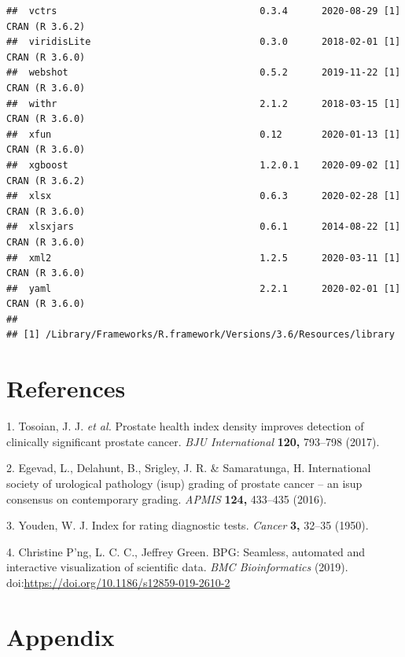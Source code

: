 \documentclass[]{article}
\begin{document}
\begin{verbatim}
##  vctrs                                    0.3.4      2020-08-29 [1] CRAN (R 3.6.2)
##  viridisLite                              0.3.0      2018-02-01 [1] CRAN (R 3.6.0)
##  webshot                                  0.5.2      2019-11-22 [1] CRAN (R 3.6.0)
##  withr                                    2.1.2      2018-03-15 [1] CRAN (R 3.6.0)
##  xfun                                     0.12       2020-01-13 [1] CRAN (R 3.6.0)
##  xgboost                                  1.2.0.1    2020-09-02 [1] CRAN (R 3.6.2)
##  xlsx                                     0.6.3      2020-02-28 [1] CRAN (R 3.6.0)
##  xlsxjars                                 0.6.1      2014-08-22 [1] CRAN (R 3.6.0)
##  xml2                                     1.2.5      2020-03-11 [1] CRAN (R 3.6.0)
##  yaml                                     2.2.1      2020-02-01 [1] CRAN (R 3.6.0)
## 
## [1] /Library/Frameworks/R.framework/Versions/3.6/Resources/library
\end{verbatim}

\newpage

\hypertarget{references}{%
\section{References}\label{references}}

\hypertarget{refs}{}
\leavevmode\hypertarget{ref-Druskin2017}{}%
1. Tosoian, J. J. \emph{et al.} Prostate health index density improves detection of clinically significant prostate cancer. \emph{BJU International} \textbf{120,} 793--798 (2017).

\leavevmode\hypertarget{ref-ISUP2016}{}%
2. Egevad, L., Delahunt, B., Srigley, J. R. \& Samaratunga, H. International society of urological pathology (isup) grading of prostate cancer -- an isup consensus on contemporary grading. \emph{APMIS} \textbf{124,} 433--435 (2016).

\leavevmode\hypertarget{ref-Youden1950}{}%
3. Youden, W. J. Index for rating diagnostic tests. \emph{Cancer} \textbf{3,} 32--35 (1950).

\leavevmode\hypertarget{ref-BPG}{}%
4. Christine P'ng, L. C. C., Jeffrey Green. BPG: Seamless, automated and interactive visualization of scientific data. \emph{BMC Bioinformatics} (2019). doi:\href{https://doi.org/https://doi.org/10.1186/s12859-019-2610-2}{https://doi.org/10.1186/s12859-019-2610-2}

\newpage

\hypertarget{appendix}{%
\section{Appendix}\label{appendix}}
\end{document}
